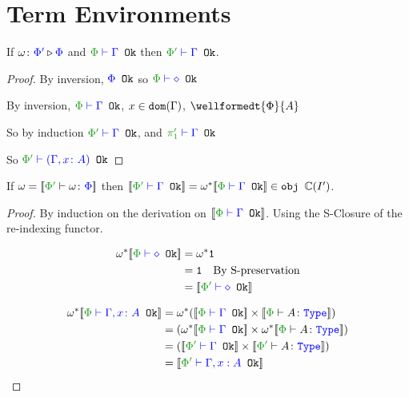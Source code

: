 \documentclass{report}
\begin{document}
\section{Term Environments}
 
\begin{theorem}
If $\omega \colon {\color{blue}\Phi'} \triangleright {\color {blue} \Phi}$ and $\wellformedok{\P}{\G}$  then $\wellformedok{\P'}{\G}$.
\end{theorem}

\begin{framed}
     \begin{proof}
            \case{\envnil}
            By inversion,  ${\color{blue} \Phi} \texttt{ Ok}$ so $\wellformedok{\P}{\nil}$
            \case{\envextend}
        
            By inversion,  $\wellformedok{\P}{\G}$, $x\in\texttt{dom}(\Gamma)$, $\wellformedt{\P}{A}$
        
            So by induction $\wellformedok{\P'}{\G}$, and $\wellformedok{\p'}{\G}$
        
            So $\wellformedok{\P'}{(\gax)}$
     \end{proof}
        
    
\end{framed}
\begin{theorem}
      
    If $\w = \deno{\typerelation{\P'}{\w}{\P}}$ then $\deno{\wellformedok{\P'}{\G}} = \w\star\deno{\wellformedok{\P}{\G}}\in\obj\C(I')$.
\end{theorem}

\begin{framed}
    \begin{proof}
        By induction on the derivation on $\deno{\wellformedok{\P}{\G}}$. Using the S-Closure of the re-indexing functor.
        
        \case{\envnil}
        \begin{align*}
            \w\star\deno{\wellformedok{\P}{\nil}} &=\w\star\1\\
            & = \1\qt{By S-preservation}\\
            &= \deno{\wellformedok{\P'}{\nil}}\\
        \end{align*}
        
        \case{\envextend}
        \begin{align*}
           \w\star\deno{\wellformedok{\P}{\gax}} &= \w\star(\deno{\wellformedok{\P}{\G}} \times \deno{\typerelation{\P}{A}{\type}}) \\
           & = (\w\star\deno{\wellformedok{\P}{\G}} \times \w\star\deno{\typerelation{\P}{A}{\type}})\\
            & = (\deno{\wellformedok{\P'}{\G}} \times \deno{\typerelation{\P'}{A}{\type}})\\
            & = \deno{\wellformedok{\P'}{\G, x: A}}\\
        \end{align*}
        
    \end{proof}
\end{framed}
\end{document}
